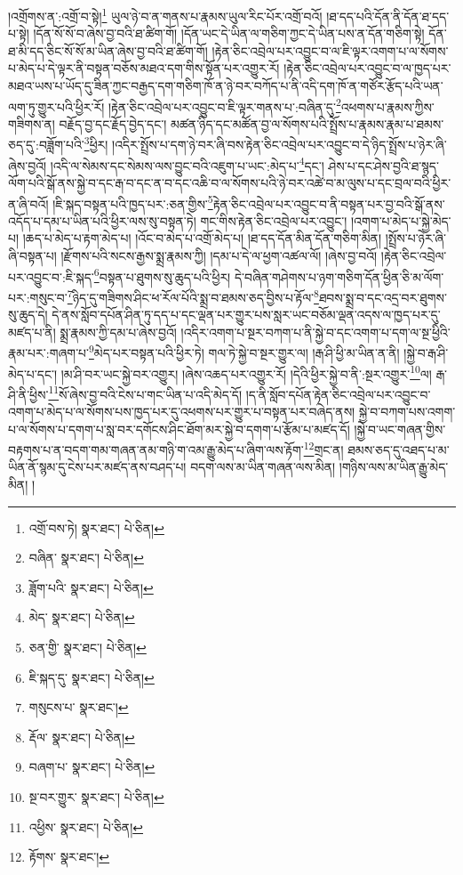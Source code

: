 །འགྲོགས་ན་:འགྲོ་བ་སྟེ།\footnote{འགྲོ་བས་ཏེ།  སྣར་ཐང་།  པེ་ཅིན། } ཡུལ་ཉེ་བ་ན་གནས་པ་རྣམས་ཡུལ་རིང་པོར་འགྲོ་བའོ། །ཐ་དད་པའི་དོན་ནི་དོན་ཐ་དད་པ་སྟེ། །དོན་སོ་སོ་བ་ཞེས་བྱ་བའི་ཐ་ཚིག་གོ། །དོན་ཡང་དེ་ཡིན་ལ་གཅིག་ཀྱང་དེ་ཡིན་པས་ན་དོན་གཅིག་སྟེ། དོན་ཐ་མི་དད་ཅིང་སོ་སོ་མ་ཡིན་ཞེས་བྱ་བའི་ཐ་ཚིག་གོ། །རྟེན་ཅིང་འབྲེལ་པར་འབྱུང་བ་ལ་ཇི་ལྟར་འགག་པ་ལ་སོགས་པ་མེད་པ་དེ་ལྟར་ནི་བསྟན་བཅོས་མཐའ་དག་གིས་སྟོན་པར་འགྱུར་རོ། །རྟེན་ཅིང་འབྲེལ་པར་འབྱུང་བ་ལ་ཁྱད་པར་མཐའ་ཡས་པ་ཡོད་དུ་ཟིན་ཀྱང་བརྒྱད་དག་གཅིག་ཁོ་ན་ཉེ་བར་བཀོད་པ་ནི་འདི་དག་ཁོ་ན་གཙོར་རྩོད་པའི་ཡན་ལག་ཏུ་གྱུར་པའི་ཕྱིར་རོ། །རྟེན་ཅིང་འབྲེལ་པར་འབྱུང་བ་ཇི་ལྟར་གནས་པ་:བཞིན་དུ་\footnote{བཞིན་  སྣར་ཐང་།  པེ་ཅིན། }འཕགས་པ་རྣམས་ཀྱིས་གཟིགས་ན། བརྗོད་བྱ་དང་རྗོད་བྱེད་དང་། མཚན་ཉིད་དང་མཚོན་བྱ་ལ་སོགས་པའི་སྤྲོས་པ་རྣམས་རྣམ་པ་ཐམས་ཅད་དུ་:བཟློག་པའི་\footnote{ཟློག་པའི་  སྣར་ཐང་།  པེ་ཅིན། }ཕྱིར། །འདིར་སྤྲོས་པ་དག་ཉེ་བར་ཞི་བས་རྟེན་ཅིང་འབྲེལ་པར་འབྱུང་བ་དེ་ཉིད་སྤྲོས་པ་ཉེར་ཞི་ཞེས་བྱའོ། །འདི་ལ་སེམས་དང་སེམས་ལས་བྱུང་བའི་འཇུག་པ་ཡང་:མེད་པ་\footnote{མེད་  སྣར་ཐང་།  པེ་ཅིན། }དང་། ཤེས་པ་དང་ཤེས་བྱའི་ཐ་སྙད་ལོག་པའི་སྒོ་ནས་སྐྱེ་བ་དང་རྒ་བ་དང་ན་བ་དང་འཆི་བ་ལ་སོགས་པའི་ཉེ་བར་འཚེ་བ་མ་ལུས་པ་དང་བྲལ་བའི་ཕྱིར་ན་ཞི་བའོ། །ཇི་སྐད་བསྟན་པའི་ཁྱད་པར་:ཅན་གྱིས་\footnote{ཅན་གྱི་  སྣར་ཐང་།  པེ་ཅིན། }རྟེན་ཅིང་འབྲེལ་པར་འབྱུང་བ་ནི་བསྟན་པར་བྱ་བའི་སྒོ་ནས་འདོད་པ་དམ་པ་ཡིན་པའི་ཕྱིར་ལས་སུ་བསྟན་ཏེ། གང་གིས་རྟེན་ཅིང་འབྲེལ་པར་འབྱུང་། །འགག་པ་མེད་པ་སྐྱེ་མེད་པ། །ཆད་པ་མེད་པ་རྟག་མེད་པ། །འོང་བ་མེད་པ་འགྲོ་མེད་པ། །ཐ་དད་དོན་མིན་དོན་གཅིག་མིན། །སྤྲོས་པ་ཉེར་ཞི་ཞི་བསྟན་པ། །རྫོགས་པའི་སངས་རྒྱས་སྨྲ་རྣམས་ཀྱི། །དམ་པ་དེ་ལ་ཕྱག་འཚལ་ལོ། །ཞེས་བྱ་བའོ། །རྟེན་ཅིང་འབྲེལ་པར་འབྱུང་བ་:ཇི་སྐད་\footnote{ཇི་སྐད་དུ་  སྣར་ཐང་།  པེ་ཅིན། }བསྟན་པ་ཐུགས་སུ་ཆུད་པའི་ཕྱིར། དེ་བཞིན་གཤེགས་པ་ཉག་གཅིག་དོན་ཕྱིན་ཅི་མ་ལོག་པར་:གསུང་བ་\footnote{གསུངས་པ་  སྣར་ཐང་། }ཉིད་དུ་གཟིགས་ཤིང་ཕ་རོལ་པོའི་སྨྲ་བ་ཐམས་ཅད་བྱིས་པ་རྟོལ་\footnote{རྡོལ་  སྣར་ཐང་།  པེ་ཅིན། }ཐབས་སྨྲ་བ་དང་འདྲ་བར་ཐུགས་སུ་ཆུད་དེ། དེ་ནས་སློབ་དཔོན་ཤིན་ཏུ་དད་པ་དང་ལྡན་པར་གྱུར་པས་སླར་ཡང་བཅོམ་ལྡན་འདས་ལ་ཁྱད་པར་དུ་མཛད་པ་ནི། སྨྲ་རྣམས་ཀྱི་དམ་པ་ཞེས་བྱའོ། །འདིར་འགག་པ་སྔར་བཀག་པ་ནི་སྐྱེ་བ་དང་འགག་པ་དག་ལ་སྔ་ཕྱིའི་རྣམ་པར་:གཞག་པ་\footnote{བཞག་པ་  སྣར་ཐང་།  པེ་ཅིན། }མེད་པར་བསྟན་པའི་ཕྱིར་ཏེ། གལ་ཏེ་སྐྱེ་བ་སྔར་གྱུར་ལ། །རྒ་ཤི་ཕྱི་མ་ཡིན་ན་ནི། །སྐྱེ་བ་རྒ་ཤི་མེད་པ་དང་། །མ་ཤི་བར་ཡང་སྐྱེ་བར་འགྱུར། །ཞེས་འཆད་པར་འགྱུར་རོ། །དེའི་ཕྱིར་སྐྱེ་བ་ནི་:སྔར་འགྱུར་\footnote{སྔ་བར་གྱུར་  སྣར་ཐང་།  པེ་ཅིན། }ལ། རྒ་ཤི་ནི་ཕྱིས་\footnote{འཕྱིས་  སྣར་ཐང་།  པེ་ཅིན། }སོ་ཞེས་བྱ་བའི་ངེས་པ་གང་ཡིན་པ་འདི་མེད་དོ། །ད་ནི་སློབ་དཔོན་རྟེན་ཅིང་འབྲེལ་པར་འབྱུང་བ་འགག་པ་མེད་པ་ལ་སོགས་པས་ཁྱད་པར་དུ་འཕགས་པར་གྱུར་པ་བསྟན་པར་བཞེད་ནས། སྐྱེ་བ་བཀག་པས་འགག་པ་ལ་སོགས་པ་དགག་པ་སླ་བར་དགོངས་ཤིང་ཐོག་མར་སྐྱེ་བ་དགག་པ་རྩོམ་པ་མཛད་དོ། །སྐྱེ་བ་ཡང་གཞན་གྱིས་བརྟགས་པ་ན་བདག་གམ་གཞན་ནམ་གཉི་ག་འམ་རྒྱུ་མེད་པ་ཞིག་ལས་རྟོག་\footnote{རྟོགས་  སྣར་ཐང་། }གྲང་ན། ཐམས་ཅད་དུ་འཐད་པ་མ་ཡིན་ནོ་སྙམ་དུ་ངེས་པར་མཛད་ནས་བཤད་པ། བདག་ལས་མ་ཡིན་གཞན་ལས་མིན། །གཉིས་ལས་མ་ཡིན་རྒྱུ་མེད་མིན། །
